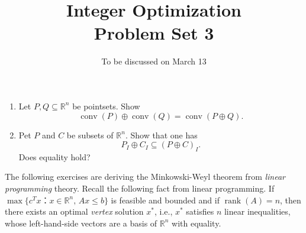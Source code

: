 \documentclass[11pt,a4paper]{article}
\title{Integer Optimization  \\ Problem Set 3 }
\date{To be discussed on March 13}
\DeclareMathOperator{\conv}{conv}
\DeclareMathOperator{\rank}{rank}
\begin{document}
\maketitle 




\begin{enumerate} 
\item Let $P,Q ⊆ ℝ^n$ be pointsets.  Show
  \begin{displaymath}
    \conv(P) ⊕ \conv(Q) = \conv(P ⊕Q). 
  \end{displaymath}

\item Pet $P$ and $C$ be  subsets of $ℝ^n$. Show that one has 
  \begin{displaymath}
    P_I ⊕ C_I ⊆ (P ⊕ C)_I.
  \end{displaymath}
  Does equality hold? 
\end{enumerate}

\noindent
The following exercises are deriving the Minkowski-Weyl theorem from \emph{linear programming } theory. %
Recall the following fact from linear programming. If $\max\{ c^T x ：x ∈ ℝ^n, \,Ax ≤ b\}$ is feasible and bounded and if $\rank(A) = n$, then there exists an optimal \emph{vertex} solution $x^*$, i.e., $x^*$ satisfies $n$ linear inequalities,  whose left-hand-side vectors are a basis of $ℝ^n$ with equality. 
\end{document}
